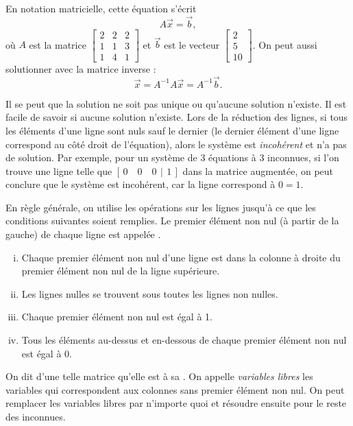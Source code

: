 En notation matricielle, cette équation s’écrit
\begin{equation*}
A \vec{x} = \vec{b} ,
\end{equation*}
où $A$ est la matrice
$\left[ \begin{smallmatrix}
2 & 2 & 2 \\
1 & 1 & 3 \\
1 & 4 & 1 
\end{smallmatrix} \right]$ et $\vec{b}$ est le vecteur
$\left[ \begin{smallmatrix}
2 \\
5 \\
10
\end{smallmatrix} \right]$.  On peut aussi solutionner avec la matrice inverse :
\begin{equation*}
\vec{x} = A^{-1} A \vec{x} = A^{-1} \vec{b} .
\end{equation*}

\medskip

Il se peut que la solution ne soit pas unique ou qu'aucune solution n’existe. Il est facile de savoir si aucune solution n'existe. Lors de la réduction des lignes, si tous les éléments d'une ligne sont nuls sauf le dernier (le dernier élément d’une ligne correspond au côté droit de l'équation), alors le système est \emph{incohérent} et n'a pas de solution. Par exemple, pour un système de 3 équations à 3 inconnues, si l'on trouve une ligne telle que $[\,0 \quad 0 \quad 0 ~\,|\,~ 1\,]$ dans la matrice augmentée, on peut conclure que le système est incohérent, car la ligne correspond à $0=1$.

\medskip

En règle générale, on utilise les opérations sur les lignes jusqu’à ce que les conditions suivantes soient remplies. Le premier élément non nul (à partir de la gauche) de chaque ligne est appelée
\emph{}.
\begin{enumerate}[(i)]
\item Chaque premier élément non nul d’une ligne est dans la colonne à droite du premier élément non nul de la ligne supérieure.
\item Les lignes nulles se trouvent sous toutes les lignes non nulles.
\item Chaque premier élément non nul est égal à 1.
\item Tous les éléments au-dessus et en-dessous de chaque premier élément non nul est égal à 0.
\end{enumerate}
On dit d'une telle matrice qu'elle est à sa
\emph{}. On appelle \emph{variables libres} les variables qui correspondent aux colonnes sans premier élément non nul. On peut remplacer les variables libres par n’importe quoi et résoudre ensuite pour le reste des inconnues.

